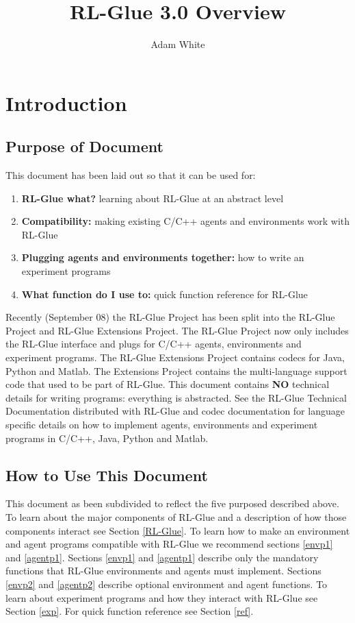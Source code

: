 \documentclass[11pt]{article}
\title{RL-Glue 3.0 Overview}
\author{Adam White}
\begin{document}
\maketitle
\tableofcontents


\section{Introduction}
\subsection{Purpose of Document}
This document has been laid out so that it can be used for: 
\begin{enumerate}
\item  {\bf RL-Glue what?} learning about RL-Glue at an abstract level
\item {\bf Compatibility:} making existing C/C++ agents and environments work with RL-Glue
\item {\bf Plugging agents and environments together:} how to write an experiment programs
\item{\bf What function do I use to:} quick function reference for RL-Glue
\end{enumerate}

Recently (September 08) the RL-Glue Project has been split into the RL-Glue Project and RL-Glue Extensions Project. The RL-Glue Project now only includes the RL-Glue interface and plugs for C/C++ agents, environments and experiment programs. The RL-Glue Extensions Project contains codecs for Java, Python and Matlab. The Extensions Project contains the multi-language support code that used to be part of RL-Glue. This document contains {\bf NO} technical details for writing programs: everything is abstracted. See the RL-Glue Technical Documentation distributed with RL-Glue and codec documentation for language specific details on how to implement agents, environments and experiment programs in C/C++, Java, Python and Matlab.
 
\subsection{How to Use This Document}

This document as been subdivided to reflect the five purposed described above. To learn about the major components of RL-Glue and a description of how those components interact see Section \ref{RL-Glue}. To learn how to make an environment and agent programs compatible with RL-Glue we recommend sections \ref{envp1} and \ref{agentp1}. Sections \ref{envp1} and \ref{agentp1} describe only the mandatory functions that RL-Glue environments and agents must implement. Sections \ref{envp2} and \ref{agentp2} describe optional environment and agent functions. To learn about experiment programs and how they interact with RL-Glue see Section \ref{exp}. For quick function reference see Section \ref{ref}.
\end{document}
